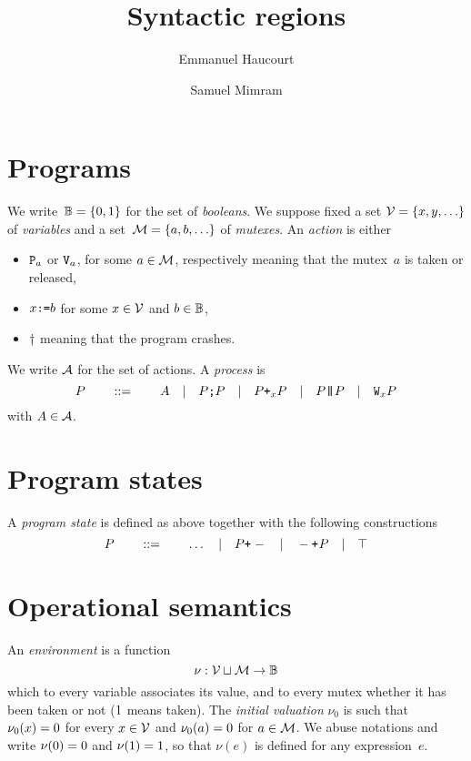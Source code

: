 \documentclass[a4paper]{article}
\title{Syntactic regions}
\author{Emmanuel Haucourt \and Samuel Mimram}
\theoremstyle{theorem}
\theoremstyle{remark}
\begin{document}
\maketitle

\section{Programs}
We write~$\B=\set{\Bfalse,\Btrue}$ for the set of \emph{booleans}. We suppose
fixed a set $\variables=\set{x,y,\ldots}$ of \emph{variables} and a
set~$\mutexes=\set{a,b,\ldots}$ of \emph{mutexes}.
An \emph{action} is either
\begin{itemize}
\item $\P a$ or $\V a$, for some $a\in\mutexes$, respectively meaning that the
  mutex~$a$ is taken or released,
\item $\pset x b$ for some $x\in\variables$ and $b\in\B$,
\item $\pdie$ meaning that the program crashes.
\end{itemize}
We write $\actions$ for the set of actions. A \emph{process} is
\[
  P
  \qquad::=\qquad
  A
  \quad|\quad
  \pseq PP
  \quad|\quad
  \por xPP
  \quad|\quad
  \ppar PP
  \quad|\quad
  \ploop xP
\]
with $A\in\actions$.

\section{Program states}
A \emph{program state} is defined as above together with the following
constructions
\[
  P
  \qquad::=\qquad
  \ldots
  \quad|\quad
  \porl P
  \quad|\quad
  \porr P
  \quad|\quad
  \pskip
\]

\section{Operational semantics}
An
\emph{environment} is a function
\[
  \nu:\variables\sqcup\mutexes\to\B
\]
which to every variable associates its value, and to every mutex whether it has
been taken or not ($\Btrue$ means taken). The \emph{initial valuation} $\nu_0$
is such that $\nu_0(x)=\Bfalse$ for every $x\in\variables$ and
$\nu_0(a)=\Bfalse$ for $a\in\mutexes$. We abuse notations and write
$\nu(\Bfalse)=\Bfalse$ and $\nu(\Btrue)=\Btrue$, so that $\nu(e)$ is defined for
any expression~$e$.
\end{document}
